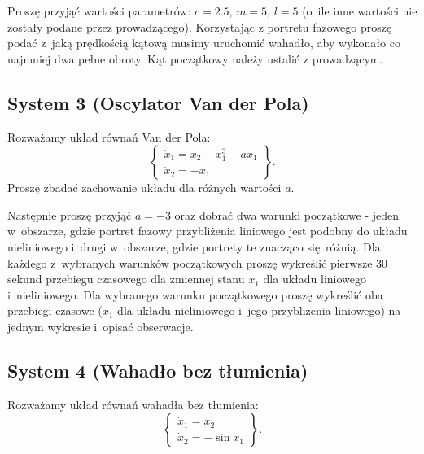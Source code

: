 \documentclass{sprawozdanie-agh}
\begin{document}
        Proszę przyjąć wartości parametrów: $c = 2.5$, $m = 5$, $l = 5$ (o~ile inne
        wartości nie zostały podane przez prowadzącego). Korzystając z portretu fazowego proszę podać z~jaką prędkością
        kątową musimy uruchomić wahadło, aby wykonało co najmniej dwa pełne obroty. Kąt początkowy należy ustalić z prowadzącym.

        \subsection{System 3 (Oscylator Van der Pola)} \label{sec:posrednia_3}
        Rozważamy układ równań Van der Pola:
        \begin{equation}
            \label{eq:posrednia_3}
            \left\{
            \begin{array}{l}
                 \dot{x}_{1} = x_{2} - x_{1}^{3} - ax_{1}\\
                 \dot{x}_{2} = -x_{1}
            \end{array}
            \right\}.
        \end{equation}
        Proszę zbadać zachowanie układu dla różnych wartości $a$.

        Następnie proszę przyjąć $a = -3$ oraz dobrać dwa warunki początkowe - jeden w~obszarze,
        gdzie portret fazowy przybliżenia liniowego jest podobny do układu
        nieliniowego i~drugi w~obszarze, gdzie portrety te znacząco się różnią.
        Dla każdego z~wybranych warunków początkowych proszę wykreślić pierwsze 30 sekund
        przebiegu czasowego dla zmiennej stanu $x_1$ dla układu liniowego
        i~nieliniowego.
        Dla wybranego warunku początkowego proszę wykreślić oba przebiegi czasowe ($x_1$
        dla układu nieliniowego i~jego przybliżenia liniowego) na jednym
        wykresie i~opisać obserwacje.

        \subsection{System 4 (Wahadło bez tłumienia)} \label{sec:posrednia_4}
        Rozważamy układ równań wahadła bez tłumienia:
        \begin{equation}
            \label{eq:posrednia_4}
            \left\{
            \begin{array}{l}
                 \dot{x}_{1} = x_{2}\\
                 \dot{x}_{2} = -\sin{x_1}
            \end{array}
            \right\}.
        \end{equation}
\end{document}
